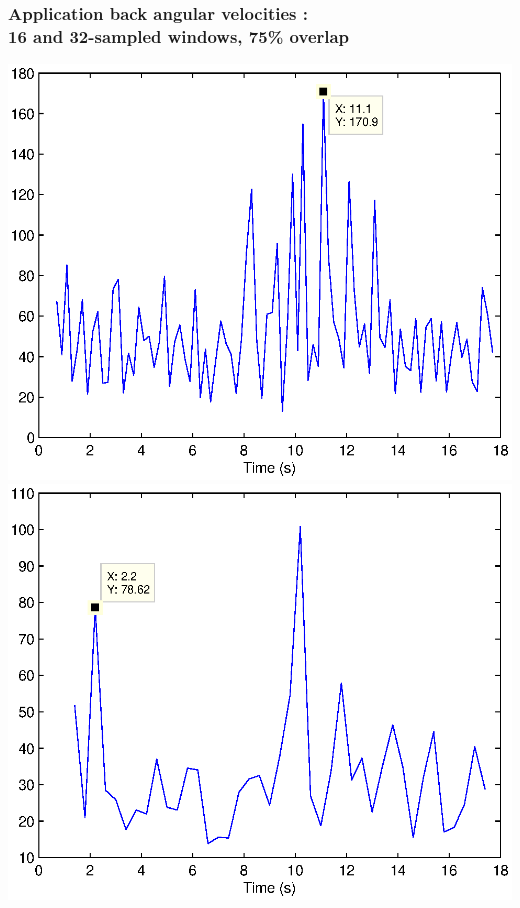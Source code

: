 \documentclass{beamer}
\begin{document}
\begin{frame}
\frametitle{Application back angular velocities :\\16 and 32-sampled windows, 75\% overlap}
\hspace*{-1.8cm}\includegraphics[scale=0.47]{examplewasser16gyr}\includegraphics[scale=0.47]{examplewasser32gyr}
\end{frame}
\end{document}
